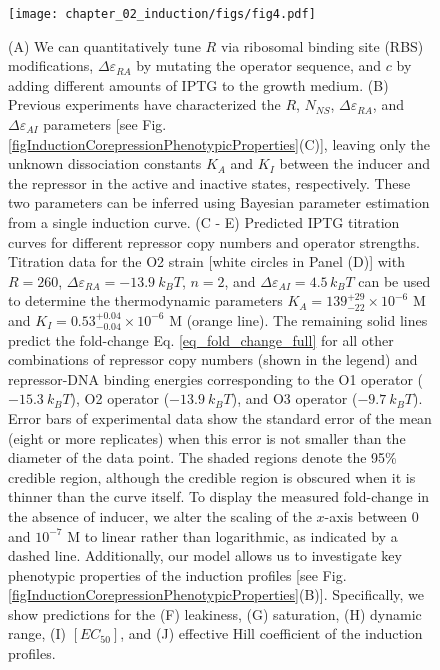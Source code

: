 \begin{figure}[p]
	\centering \texttt{[image: chapter\_02\_induction/figs/fig4.pdf]}

	\caption[Predicting induction profiles for different biological control
		parameters.] {(A) We can quantitatively tune $R$ via ribosomal
	binding site (RBS) modifications, $\Delta\varepsilon_{RA}$ by mutating the
	operator sequence, and $c$ by adding different amounts of IPTG to the growth
	medium. (B) Previous experiments have characterized the $R$,
	$N_{NS}$, $\Delta\varepsilon_{RA}$, and $\Delta\varepsilon_{AI}$ parameters
	[see Fig. \ref{figInductionCorepressionPhenotypicProperties}(C)], leaving only the unknown dissociation constants
	$K_A$ and $K_I$ between the inducer and the repressor in the active and
	inactive states, respectively. These two parameters can be inferred using
	Bayesian parameter estimation from a single induction curve. (C - E)
	Predicted IPTG titration curves for different repressor copy numbers and
	operator strengths. Titration data for the O2 strain [white circles in Panel
	(D)] with $R=260$, $\Delta\varepsilon_{RA} = -13.9~k_BT$, $n=2$, and
	$\Delta\varepsilon_{AI}=4.5\,k_BT$ can be used to determine the thermodynamic
	parameters $K_A=139^{+29}_{-22} \times 10^{-6}$ M and
	$K_I=0.53^{+0.04}_{-0.04} \times 10^{-6}$ M (orange line). The
	remaining solid lines predict the fold-change Eq. \ref{eq_fold_change_full} for
	all other combinations of repressor copy numbers (shown in the legend) and
	repressor-DNA binding energies corresponding to the O1 operator ($-15.3~k_B
	T$), O2 operator ($-13.9~k_B T$), and O3 operator ($-9.7~k_B T$). Error bars of
	experimental data show the standard error of the mean (eight or more
	replicates) when this error is not smaller than the diameter of the data point.
	The shaded regions denote the 95\% credible region, although the credible
	region is obscured when it is thinner than the curve itself. To display the
	measured fold-change in the absence of inducer, we alter the scaling of the
	$x$-axis between $0$ and $10^{-7}$ M to linear rather than logarithmic, as
	indicated by a dashed line. Additionally, our model allows us to investigate
	key phenotypic properties of the induction profiles [see
	Fig. \ref{figInductionCorepressionPhenotypicProperties}(B)]. Specifically,
	we show predictions for the (F) leakiness, (G)
	saturation, (H) dynamic range, (I) $[EC_{50}]$, and
	(J) effective Hill coefficient of the induction profiles.}
\label{fig_O2_R260_fit}
\end{figure}

